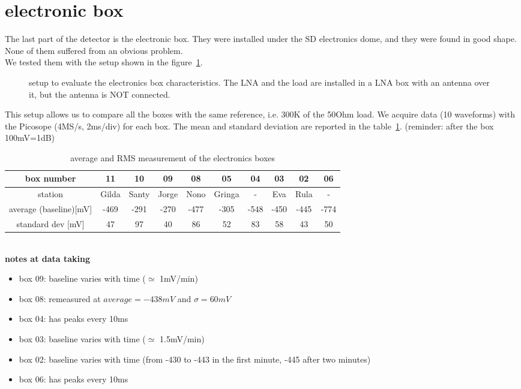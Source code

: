 \section{electronic box}
The  last part  of  the detector  is  the electronic  box.  They  were
installed under the  SD electronics dome, and they  were found in good
shape. None of them suffered from an obvious problem.\\ We tested them
with the setup shown in the figure~\ref{fig:setupbox}. 
\begin{figure}[!ht]
  \centering
  \hspace*{-3ex}
  \caption{setup to evaluate  the electronics box characteristics. The
    LNA and the  load are installed in a LNA box  with an antenna over
    it, but the antenna is NOT connected.}
  \label{fig:setupbox}
\end{figure}
This setup allows us to compare all the boxes with the same reference,
i.e. 300K of  the 50Ohm load. We acquire data  (10 waveforms) with the
Picosope  (4MS/s,  2ms/div)  for  each  box.  The  mean  and  standard
deviation  are  reported  in the  table~\ref{tab:boxtab}.   (reminder:
after the box 100mV=1dB)
\begin{table}[h!]
  \centering
  \caption{average and RMS measurement of the electronics boxes}
  \label{tab:boxtab}
  \begin{tabular}{|c||c|c|c|c|c|c|c|c|c|}
    \hline
    box number & 11  & 10 & 09 & 08 & 05 & 04 & 03 & 02 & 06 \\
    \hline
    station & Gilda  & Santy &  Jorge & Nono & Gringa & - & Eva & Rula & -  \\
    \hline
    average (baseline)[mV] & -469 & -291 &  -270 & -477 & -305 & -548 & -450 & -445 & -774 \\
    \hline
    standard dev  [mV] & 47 & 97 & 40 & 86 & 52 & 83 & 58 & 43 & 50 \\
    \hline
  \end{tabular}
\end{table}
\\
\textbf{notes at data taking}
\begin{itemize}
\item box 09: baseline varies with time ($\simeq$ 1mV/min)
\item box 08: remeasured at $ average = -438 mV$ and $\sigma = 60 mV$
\item box 04: has peaks every 10ms
\item box 03: baseline varies with time ($\simeq$ 1.5mV/min)
\item box 02: baseline varies with time (from -430 to -443 in the first minute, -445 after two minutes)
\item box 06: has peaks every 10ms
\end{itemize}


